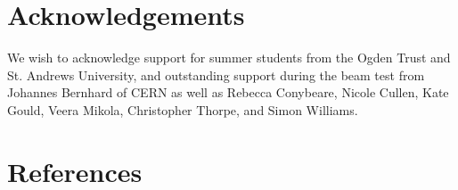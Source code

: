 \documentclass[instruments,article,submit,moreauthors,pdftex]{Definitions/mdpi}
\begin{document}
	

	\linenumbers

	

	

	

	

        


	\newenvironment{acknowledgement}{\relax}{\relax}
	\begin{acknowledgement}
		\section*{Acknowledgements}
		We wish to acknowledge support for summer students from the Ogden Trust and St. Andrews University, and outstanding support during the beam test from Johannes Bernhard of CERN as well as
		Rebecca Conybeare, Nicole Cullen, Kate Gould, Veera Mikola, Christopher Thorpe, and	Simon Williams.
	\end{acknowledgement}



	\section*{References}
    
\end{document}
